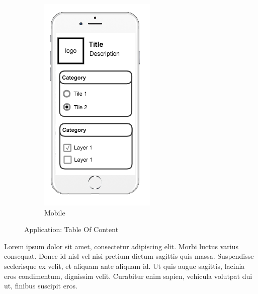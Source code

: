 \begin{figure}[ht]
\begin{subfigure}[b]{0.2\textwidth}
        \includegraphics[width=\textwidth]
          {img/c02-application/png/mobile-basemap-toc.png}
        \caption{Mobile}
    \end{subfigure}
    \caption{Application: Table Of Content}
\end{figure}

Lorem ipsum dolor sit amet, consectetur adipiscing elit. Morbi luctus varius consequat. Donec id nisl vel nisi pretium dictum sagittis quis massa. Suspendisse scelerisque ex velit, et aliquam ante aliquam id. Ut quis augue sagittis, lacinia eros condimentum, dignissim velit. Curabitur enim sapien, vehicula volutpat dui ut, finibus suscipit eros. 


